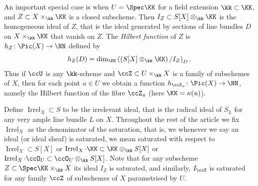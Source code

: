 \documentclass[12pt,a4paper]{article}
\newcommand{\Irrel}[1]{\operatorname {Irrel}_{#1}}
\begin{document}
An important special case is when $U=\Spec \KK$ for a field extension $\kk\subset \KK$,  and
   $Z\subset X\times_{\kk} \KK$ is a closed subscheme.
Then $I_Z \subset S[X]\otimes_{\kk}\KK$ is the homogeneous ideal of $Z$, that is the ideal generated by sections of line bundles $D$ on $X\times_{\kk} \KK$ that vanish on $Z$.
The \emph{Hilbert function} of $Z$ is $h_Z\colon \Pic(X) \to \NN$ defined by
\[
h_Z(D) = \dim_{\KK} \left(\left(S[X]\otimes_{\kk}\KK\right)/I_{Z}\right)_D.
\]
Thus if $\ccU$ is any $\kk$-scheme
and  $\ccZ \subset U \times_{\kk} X$ is a family of subschemes of $X$, then for each point $u \in U$ we obtain a function $h_{\ccZ_u} \colon \Pic(X)\to \NN$, namely the Hilbert function of the fibre $\ccZ_u$ (here $\KK = \kappa (u)$).


Define $\Irrel{X}\subset S$ to be the irrelevant ideal,
   that is the radical ideal of $S_L$ for any very ample line bundle $L$ on $X$.
Throughout the rest of the article we fix $\Irrel{X}$ as the denominator of the saturation,
  that is, we whenever we say an ideal (or ideal sheaf) is saturated, we mean saturated with respect to $\Irrel{X} \subset S[X]$
  or $\Irrel{X} \cdot \KK \subset \KK \otimes_{\kk} S[X]$
  or
  $\Irrel{X} \cdot \ccO_U \subset \ccO_U \otimes_{\kk} S[X]$.
Note that for any subscheme $Z\subset \Spec \KK \times_{\kk}X$ its ideal $I_Z$ is saturated, and similarly, $I_{\ccZ}$ is saturated for any family
$\ccZ$ of subschemes of $X$ parametrised by $U$.
\end{document}
